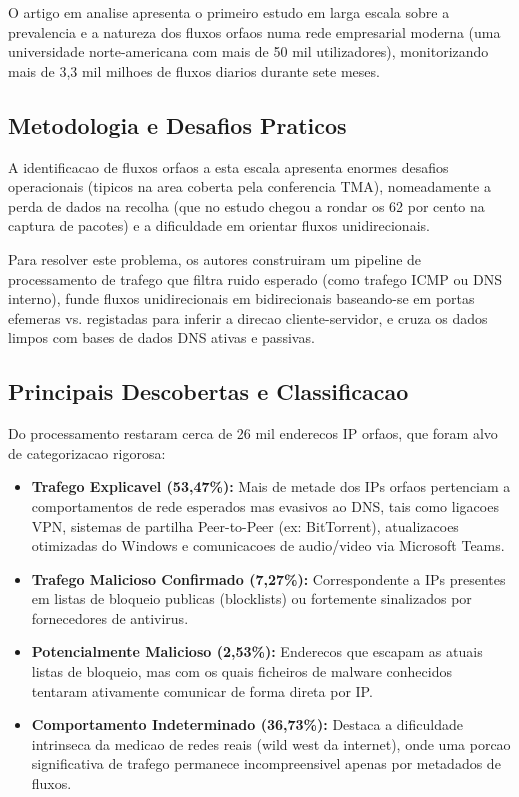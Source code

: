 \documentclass[11pt, a4paper]{article}
\begin{document}
O artigo em analise apresenta o primeiro estudo em larga escala sobre a prevalencia e a natureza dos fluxos orfaos numa rede empresarial moderna (uma universidade norte-americana com mais de 50 mil utilizadores), monitorizando mais de 3,3 mil milhoes de fluxos diarios durante sete meses.

\subsection{Metodologia e Desafios Praticos}
A identificacao de fluxos orfaos a esta escala apresenta enormes desafios operacionais (tipicos na area coberta pela conferencia TMA), nomeadamente a perda de dados na recolha (que no estudo chegou a rondar os 62 por cento na captura de pacotes) e a dificuldade em orientar fluxos unidirecionais. 

Para resolver este problema, os autores construiram um pipeline de processamento de trafego que filtra ruido esperado (como trafego ICMP ou DNS interno), funde fluxos unidirecionais em bidirecionais baseando-se em portas efemeras vs. registadas para inferir a direcao cliente-servidor, e cruza os dados limpos com bases de dados DNS ativas e passivas.

\subsection{Principais Descobertas e Classificacao}
Do processamento restaram cerca de 26 mil enderecos IP orfaos, que foram alvo de categorizacao rigorosa:
\begin{itemize}
    \item \textbf{Trafego Explicavel (53,47\%):} Mais de metade dos IPs orfaos pertenciam a comportamentos de rede esperados mas evasivos ao DNS, tais como ligacoes VPN, sistemas de partilha Peer-to-Peer (ex: BitTorrent), atualizacoes otimizadas do Windows e comunicacoes de audio/video via Microsoft Teams.
    \item \textbf{Trafego Malicioso Confirmado (7,27\%):} Correspondente a IPs presentes em listas de bloqueio publicas (blocklists) ou fortemente sinalizados por fornecedores de antivirus.
    \item \textbf{Potencialmente Malicioso (2,53\%):} Enderecos que escapam as atuais listas de bloqueio, mas com os quais ficheiros de malware conhecidos tentaram ativamente comunicar de forma direta por IP.
    \item \textbf{Comportamento Indeterminado (36,73\%):} Destaca a dificuldade intrinseca da medicao de redes reais (wild west da internet), onde uma porcao significativa de trafego permanece incompreensivel apenas por metadados de fluxos.
\end{itemize}
\end{document}

